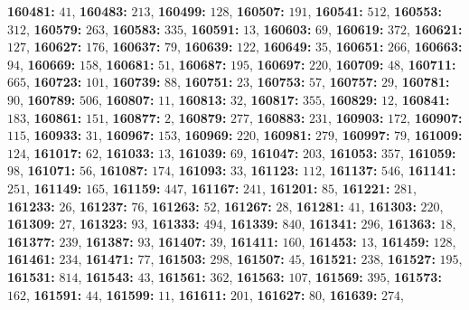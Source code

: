 \textsf{\bfseries 160481:} $41$, \textsf{\bfseries 160483:} $213$, \textsf{\bfseries 160499:} $128$, \textsf{\bfseries 160507:} $191$, \textsf{\bfseries 160541:} $512$, \textsf{\bfseries 160553:} $312$, \textsf{\bfseries 160579:} $263$, \textsf{\bfseries 160583:} $335$, \textsf{\bfseries 160591:} $13$, \textsf{\bfseries 160603:} $69$, \textsf{\bfseries 160619:} $372$, \textsf{\bfseries 160621:} $127$, \textsf{\bfseries 160627:} $176$, \textsf{\bfseries 160637:} $79$, \textsf{\bfseries 160639:} $122$, \textsf{\bfseries 160649:} $35$, \textsf{\bfseries 160651:} $266$, \textsf{\bfseries 160663:} $94$, \textsf{\bfseries 160669:} $158$, \textsf{\bfseries 160681:} $51$, \textsf{\bfseries 160687:} $195$, \textsf{\bfseries 160697:} $220$, \textsf{\bfseries 160709:} $48$, \textsf{\bfseries 160711:} $665$, \textsf{\bfseries 160723:} $101$, \textsf{\bfseries 160739:} $88$, \textsf{\bfseries 160751:} $23$, \textsf{\bfseries 160753:} $57$, \textsf{\bfseries 160757:} $29$, \textsf{\bfseries 160781:} $90$, \textsf{\bfseries 160789:} $506$, \textsf{\bfseries 160807:} $11$, \textsf{\bfseries 160813:} $32$, \textsf{\bfseries 160817:} $355$, \textsf{\bfseries 160829:} $12$, \textsf{\bfseries 160841:} $183$, \textsf{\bfseries 160861:} $151$, \textsf{\bfseries 160877:} $2$, \textsf{\bfseries 160879:} $277$, \textsf{\bfseries 160883:} $231$, \textsf{\bfseries 160903:} $172$, \textsf{\bfseries 160907:} $115$, \textsf{\bfseries 160933:} $31$, \textsf{\bfseries 160967:} $153$, \textsf{\bfseries 160969:} $220$, \textsf{\bfseries 160981:} $279$, \textsf{\bfseries 160997:} $79$, \textsf{\bfseries 161009:} $124$, \textsf{\bfseries 161017:} $62$, \textsf{\bfseries 161033:} $13$, \textsf{\bfseries 161039:} $69$, \textsf{\bfseries 161047:} $203$, \textsf{\bfseries 161053:} $357$, \textsf{\bfseries 161059:} $98$, \textsf{\bfseries 161071:} $56$, \textsf{\bfseries 161087:} $174$, \textsf{\bfseries 161093:} $33$, \textsf{\bfseries 161123:} $112$, \textsf{\bfseries 161137:} $546$, \textsf{\bfseries 161141:} $251$, \textsf{\bfseries 161149:} $165$, \textsf{\bfseries 161159:} $447$, \textsf{\bfseries 161167:} $241$, \textsf{\bfseries 161201:} $85$, \textsf{\bfseries 161221:} $281$, \textsf{\bfseries 161233:} $26$, \textsf{\bfseries 161237:} $76$, \textsf{\bfseries 161263:} $52$, \textsf{\bfseries 161267:} $28$, \textsf{\bfseries 161281:} $41$, \textsf{\bfseries 161303:} $220$, \textsf{\bfseries 161309:} $27$, \textsf{\bfseries 161323:} $93$, \textsf{\bfseries 161333:} $494$, \textsf{\bfseries 161339:} $840$, \textsf{\bfseries 161341:} $296$, \textsf{\bfseries 161363:} $18$, \textsf{\bfseries 161377:} $239$, \textsf{\bfseries 161387:} $93$, \textsf{\bfseries 161407:} $39$, \textsf{\bfseries 161411:} $160$, \textsf{\bfseries 161453:} $13$, \textsf{\bfseries 161459:} $128$, \textsf{\bfseries 161461:} $234$, \textsf{\bfseries 161471:} $77$, \textsf{\bfseries 161503:} $298$, \textsf{\bfseries 161507:} $45$, \textsf{\bfseries 161521:} $238$, \textsf{\bfseries 161527:} $195$, \textsf{\bfseries 161531:} $814$, \textsf{\bfseries 161543:} $43$, \textsf{\bfseries 161561:} $362$, \textsf{\bfseries 161563:} $107$, \textsf{\bfseries 161569:} $395$, \textsf{\bfseries 161573:} $162$, \textsf{\bfseries 161591:} $44$, \textsf{\bfseries 161599:} $11$, \textsf{\bfseries 161611:} $201$, \textsf{\bfseries 161627:} $80$, \textsf{\bfseries 161639:} $274$, 
